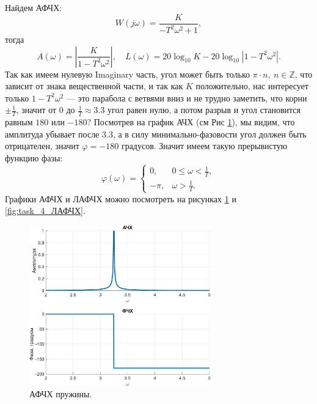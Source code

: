 Найдем АФЧХ:
\begin{equation*}
    W(j\omega)=\frac{K}{-T^2\omega^2+1},
\end{equation*}
тогда
\begin{equation*}
    A(\omega)=\left| \frac{K}{1-T^2\omega^2} \right|, \quad L(\omega)=20\log_{10}K-20\log_{10}\left| 1-T^2\omega^2 \right|.
\end{equation*}
Так как имеем нулевую Imaginary часть, угол может быть только $\pi\cdot n,\ n\in\mathbb{Z}$, что
зависит от знака вещественной части, и так как $K$ положительно, нас интересует только $1-T^2\omega^2$ ---
это парабола с ветвями вниз и не трудно заметить, что корни $\pm\frac{1}{T}$, значит от $0$ до $\frac{1}{T}\approx 3.3$
угол равен нулю, а потом разрыв и угол становится равным $180$ или $-180$? Посмотрев на график АЧХ
(см Рис \ref{fig:task_4_АФЧХ}), мы видим, что амплитуда убывает после $3.3$, а в силу 
минимально-фазовости угол должен быть отрицателен, значит $\varphi=-180$ градусов. Значит имеем такую прерывистую функцию
фазы:
\begin{equation*}
    \varphi(\omega)=\begin{cases}
        0,& 0\leq\omega<\frac{1}{T},\\
        -\pi,& \omega>\frac{1}{T}.
    \end{cases}
\end{equation*}
Графики АФЧХ и ЛАФЧХ можно посмотреть на рисунках \ref{fig:task_4_АФЧХ} и \ref{fig:task_4_ЛАФЧХ}.

\begin{figure}[H]
    \centering
    \includegraphics[width=0.7\textwidth]{figs/task_4_АФЧХ.png}
    \caption{АФЧХ пружины.}
    \label{fig:task_4_АФЧХ}
\end{figure}

